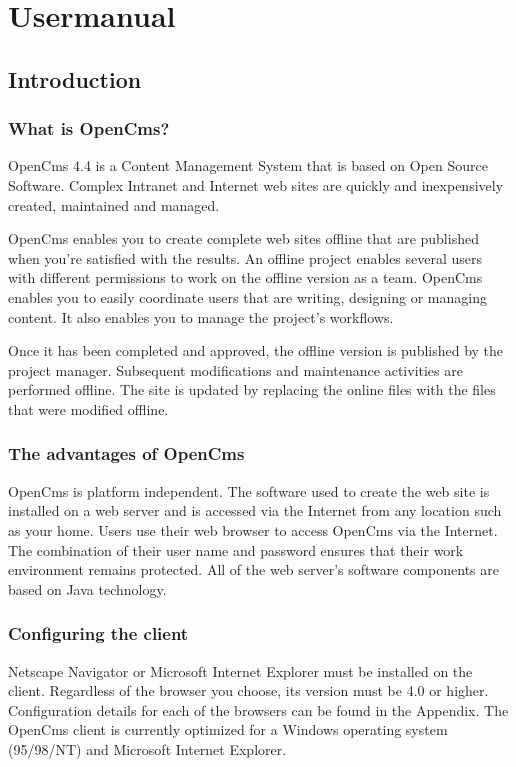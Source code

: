 \chapter{Usermanual}

\section{Introduction}

\subsection{What is OpenCms?}

OpenCms 4.4 is a Content Management System that is based on Open
Source Software. Complex Intranet and Internet web sites are
quickly and inexpensively created, maintained and managed.

OpenCms enables you to create complete web sites offline that are
published when you're satisfied with the results. An offline
project enables several users with different permissions to work
on the offline version as a team. OpenCms enables you to easily
coordinate users that are writing, designing or managing content.
It also enables you to manage the project's workflows.

Once it has been completed and approved, the offline version is
published by the project manager. Subsequent modifications and
maintenance activities are performed offline. The site is updated
by replacing the online files with the files that were modified
offline.

\subsection{The advantages of OpenCms}

OpenCms is platform independent. The software used to create the
web site is installed on a web server and is accessed via the
Internet from any location such as your home. Users use their web
browser to access OpenCms via the Internet. The combination of
their user name and password ensures that their work environment
remains protected. All of the web server's software components are
based on Java technology.

\subsection{Configuring the client}

Netscape Navigator or Microsoft Internet Explorer must be
installed on the client. Regardless of the browser you choose, its
version must be 4.0 or higher. Configuration details for each of
the browsers can be found in the Appendix. The OpenCms client is
currently optimized for a Windows operating system (95/98/NT) and
Microsoft Internet Explorer.


